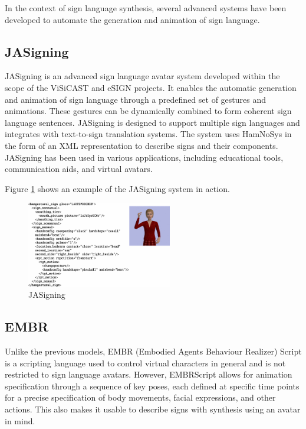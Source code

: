 \documentclass[../../main.tex]{subfiles}
\begin{document}
In the context of sign language synthesis, several advanced systems have been developed to automate the generation and animation of sign language.

\subsection{JASigning}
\label{subsec:jasigning}

JASigning is an advanced sign language avatar system developed within the scope of the ViSiCAST and eSIGN projects. It enables the automatic generation and animation of sign language through a predefined set of gestures and animations. These gestures can be dynamically combined to form coherent sign language sentences. JASigning is designed to support multiple sign languages and integrates with text-to-sign translation systems. The system uses HamNoSys in the form of an XML representation to describe signs and their components. JASigning has been used in various applications, including educational tools, communication aids, and virtual avatars.

Figure \ref{fig:jasigning} shows an example of the JASigning system in action.

\begin{figure} 
  \centering \includegraphics[width = 2.5in]{chapters/background_work/images/jasigning.png} 
  \caption{JASigning} 
  \label{fig:jasigning} 
\end{figure}

\subsection{EMBR}
\label{subsec:embr}

Unlike the previous models, EMBR (Embodied Agents Behaviour Realizer) Script is a scripting language used to control virtual characters in general and is not restricted to sign language avatars. However, EMBRScript allows for animation specification through a sequence of key poses, each defined at specific time points for a precise specification of body movements, facial expressions, and other actions. This also makes it usable to describe signs with synthesis using an avatar in mind.
\end{document}
